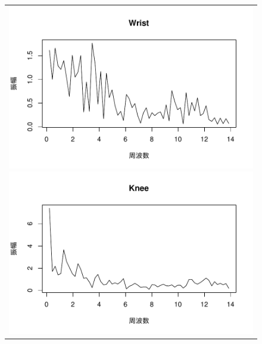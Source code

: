\documentclass[a4j]{cis-resume}
\begin{document}
\begin{figure}[H]
  \begin{flushleft}
  \vspace{20mm}
  \begin{tabular}{c}
    \begin{minipage}{0.3\linewidth}
      \begin{flushleft}
        \includegraphics[keepaspectration,scale=0.3\figscale,angle=0]{Wrist.pdf}
      \end{flushleft}
    \end{minipage}
    \begin{minipage}{0.1\linewidth}
      \hspace{2mm}
    \end{minipage}
    \begin{minipage}{0.3\linewidth}
      \begin{center}
        \includegraphics[keepaspectration,scale=0.3\figscale,angle=0]{Knee.pdf}

\end{center}
\end{minipage}
\end{tabular}
\end{flushleft}
\end{figure}
\end{document}

